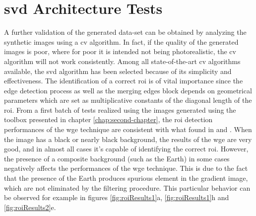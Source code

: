 \section{\acrshort{svd} Architecture Tests}
A further validation of the generated data-set can be obtained by analyzing the synthetic images using a \acrshort{cv} algorithm. In fact, if the quality of the generated images is poor, where for poor it is intended not being photorealistic, the \acrshort{cv} algorithm will not work consistently. Among all state-of-the-art \acrshort{cv} algorithms available, the \acrshort{svd} algorithm has been selected because of its simplicity and effectiveness.
The identification of a correct \acrshort{roi} is of vital importance since the edge detection process as well as the merging edges block depends on geometrical parameters which are set as multiplicative constants of the diagonal length of the \acrshort{roi}. From a first batch of tests realized using the images generated using the toolbox presented in chapter \ref{chap:second-chapter}, the \acrshort{roi} detection performances of the \acrshort{wge} technique are consistent with what found in \cite{Sharma2018} and \cite{fracchio2019}. When the image has a black or nearly black background, the results of the \acrshort{wge} are very good, and in almost all cases it's capable of identifying the correct \acrshort{roi}. However, the presence of a composite background (such as the Earth) in some cases negatively affects the performances of the \acrshort{wge} technique. This is due to the fact that the presence of the Earth produces spurious element in the gradient image, which are not eliminated by the filtering procedure. This particular behavior can be observed for example in figures \ref{fig:roiResults1}a, \ref{fig:roiResults1}h and \ref{fig:roiResults2}e.

